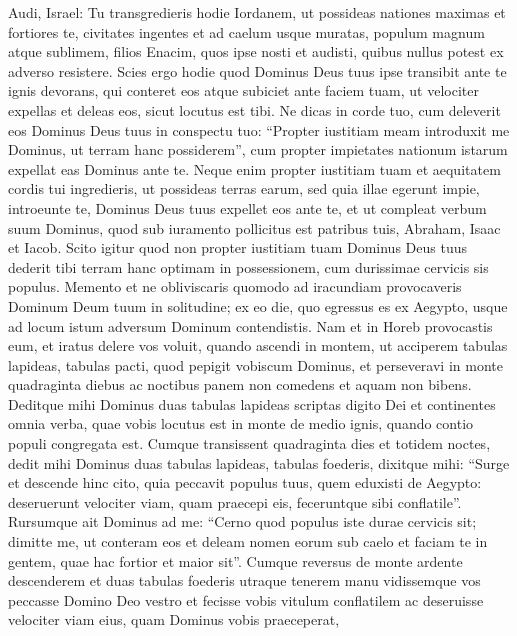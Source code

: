 \begin{biblechapter}
\begin{biblechapter}
\begin{biblechapter}
\begin{biblechapter}
\begin{biblechapter}
\begin{biblechapter}
\begin{biblechapter}
\begin{biblechapter}
\begin{biblechapter}
\verse Audi, Israel: Tu transgredieris hodie Iordanem, ut possideas nationes maximas et fortiores te, civitates ingentes et ad caelum usque muratas, 
\verse populum magnum atque sublimem, filios Enacim, quos ipse nosti et audisti, quibus nullus potest ex adverso resistere. 
\verse Scies ergo hodie quod Dominus Deus tuus ipse transibit ante te ignis devorans, qui conteret eos atque subiciet ante faciem tuam, ut velociter expellas et deleas eos, sicut locutus est tibi.
 \verse Ne dicas in corde tuo, cum deleverit eos Dominus Deus tuus in conspectu tuo: “Propter iustitiam meam introduxit me Dominus, ut terram hanc possiderem”, cum propter impietates nationum istarum expellat eas Dominus ante te. 
\verse Neque enim propter iustitiam tuam et aequitatem cordis tui ingredieris, ut possideas terras earum, sed quia illae egerunt impie, introeunte te, Dominus Deus tuus expellet eos ante te, et ut compleat verbum suum Dominus, quod sub iuramento pollicitus est patribus tuis, Abraham, Isaac et Iacob. 
\verse Scito igitur quod non propter iustitiam tuam Dominus Deus tuus dederit tibi terram hanc optimam in possessionem, cum durissimae cervicis sis populus.
 \verse Memento et ne obliviscaris quomodo ad iracundiam provocaveris Dominum Deum tuum in solitudine; ex eo die, quo egressus es ex Aegypto, usque ad locum istum adversum Dominum contendistis. 
\verse Nam et in Horeb provocastis eum, et iratus delere vos voluit, 
\verse quando ascendi in montem, ut acciperem tabulas lapideas, tabulas pacti, quod pepigit vobiscum Dominus, et perseveravi in monte quadraginta diebus ac noctibus panem non comedens et aquam non bibens. 
\verse Deditque mihi Dominus duas tabulas lapideas scriptas digito Dei et continentes omnia verba, quae vobis locutus est in monte de medio ignis, quando contio populi congregata est. 
\verse Cumque transissent quadraginta dies et totidem noctes, dedit mihi Dominus duas tabulas lapideas, tabulas foederis, 
\verse dixitque mihi: “Surge et descende hinc cito, quia peccavit populus tuus, quem eduxisti de Aegypto: deseruerunt velociter viam, quam praecepi eis, feceruntque sibi conflatile”. 
\verse Rursumque ait Dominus ad me: “Cerno quod populus iste durae cervicis sit; 
\verse dimitte me, ut conteram eos et deleam nomen eorum sub caelo et faciam te in gentem, quae hac fortior et maior sit”.
 \verse Cumque reversus de monte ardente descenderem et duas tabulas foederis utraque tenerem manu 
\verse vidissemque vos peccasse Domino Deo vestro et fecisse vobis vitulum conflatilem ac deseruisse velociter viam eius, quam Dominus vobis praeceperat, 

\end{biblechapter}
\end{biblechapter}
\end{biblechapter}
\end{biblechapter}
\end{biblechapter}
\end{biblechapter}
\end{biblechapter}
\end{biblechapter}
\end{biblechapter}
